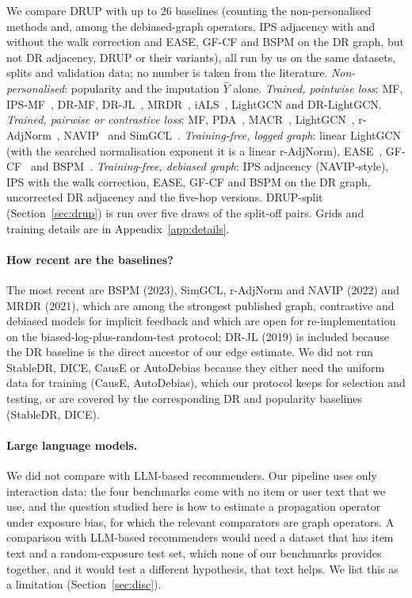 We compare DRUP with up to 26 baselines (counting the non-personalised methods and, among the debiased-graph operators,
IPS adjacency with and without the walk correction and EASE, GF-CF and BSPM on the DR graph, but not DR adjacency,
DRUP or their variants), all run by us on the same datasets,
splits and validation data; no number is taken from the literature.
\emph{Non-personalised}: popularity and the imputation $\hat Y$ alone.
\emph{Trained, pointwise loss}: MF, IPS-MF~\citep{schnabel2016}, DR-MF,
DR-JL~\citep{wang2019drjl}, MRDR~\citep{guo2021mrdr}, iALS~\citep{hu2008ials},
LightGCN and DR-LightGCN. \emph{Trained, pairwise or contrastive loss}: MF, PDA~\citep{zhang2021pda},
MACR~\citep{wei2021macr}, LightGCN~\citep{he2020lightgcn},
r-AdjNorm~\citep{zhao2022radjnorm}, NAVIP~\citep{kim2022navip} and
SimGCL~\citep{yu2022simgcl}. \emph{Training-free, logged graph}: linear
LightGCN (with the searched normalisation exponent it is a linear r-AdjNorm),
EASE~\citep{steck2019ease}, GF-CF~\citep{shen2021gfcf} and
BSPM~\citep{choi2023bspm}. \emph{Training-free, debiased graph}: IPS adjacency
(NAVIP-style), IPS with the walk correction, EASE, GF-CF and BSPM on the DR graph,
uncorrected DR adjacency and the five-hop versions. DRUP-split
(Section~\ref{sec:drup}) is run over five draws of the split-off pairs. Grids and
training details are in Appendix~\ref{app:details}.

\paragraph{How recent are the baselines?} The most recent are BSPM (2023),
SimGCL, r-AdjNorm and NAVIP (2022) and MRDR (2021), which are among the
strongest published graph, contrastive and debiased models for implicit
feedback and which are open for re-implementation on the biased-log-plus-random-test
protocol; DR-JL (2019) is included because the DR baseline is the direct
ancestor of our edge estimate. We did not run StableDR, DICE, CausE or AutoDebias
because they either need the uniform data for training (CausE, AutoDebias), which
our protocol keeps for selection and testing, or are covered by the
corresponding DR and popularity baselines (StableDR, DICE).

\paragraph{Large language models.} We did not compare with LLM-based
recommenders. Our pipeline uses only interaction data: the four benchmarks come
with no item or user text that we use, and the question studied here is how to
estimate a propagation operator under exposure bias, for which the relevant
comparators are graph operators. A comparison with LLM-based recommenders would
need a dataset that has item text and a random-exposure test set, which none of our
benchmarks provides together, and it would test a different hypothesis, that text
helps. We list this as a limitation (Section~\ref{sec:disc}).

